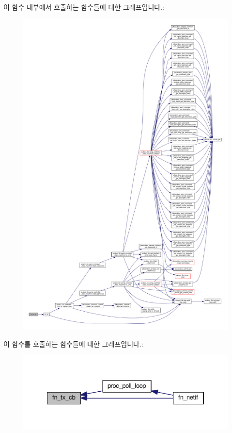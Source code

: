 이 함수 내부에서 호출하는 함수들에 대한 그래프입니다.\+:
\nopagebreak
\begin{figure}[H]
\begin{center}
\leavevmode
\includegraphics[width=350pt]{classavdecc__lib_1_1system__layer2__multithreaded__callback_a4a9be0424c86a39d845718179eccbc18_cgraph}
\end{center}
\end{figure}




이 함수를 호출하는 함수들에 대한 그래프입니다.\+:
\nopagebreak
\begin{figure}[H]
\begin{center}
\leavevmode
\includegraphics[width=334pt]{classavdecc__lib_1_1system__layer2__multithreaded__callback_a4a9be0424c86a39d845718179eccbc18_icgraph}
\end{center}
\end{figure}


